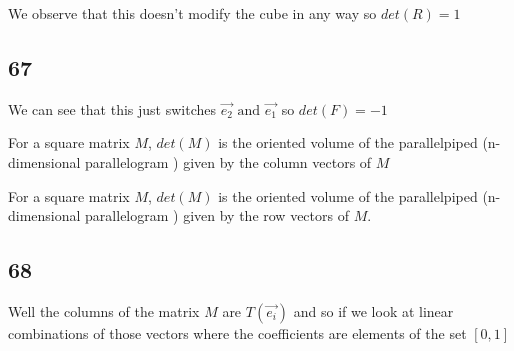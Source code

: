 \documentclass[11pt]{book}
\begin{document}
We observe that this doesn't modify the cube in any way so $\mathit{det} \left(R\right) = 1$ 


\subsection{67}%
\label{sub:67}

We can see that this just switches $\vec{e_2} \text{ and } \vec{e_1} $ so $\mathit{det} \left(F\right) = -1$ 


\begin{thm}\label{thm:volume_theorem_i}
    For a square matrix $M$, $\mathit{det} \left(M\right) $ is the oriented volume of the parallelpiped (n-dimensional parallelogram ) given by the column vectors of $M$  
\end{thm}

\begin{thm}\label{thm:volume_theorem_ii}
    For a square matrix $M$,  $\mathit{det} \left(M\right) $ is the oriented volume of the parallelpiped (n-dimensional parallelogram ) given by the row vectors  of $M$.   
\end{thm}

\subsection{68}%
\label{sub:68}

Well the columns of the matrix $M$ are $T\left(\vec{e_{i} } \right) $ and so if we look at linear combinations of those vectors where the coefficients are elements of the set $\left[ 0,1 \right] $ 



\end{document}
